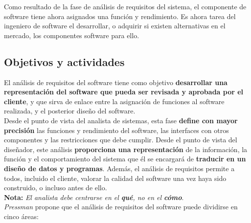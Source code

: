 Como resultado de la fase de análisis de requisitos del sistema, el componente de software tiene ahora asignados una función y rendimiento. Es ahora tarea del ingeniero de software el desarrollar, o adquirir si existen alternativas en el mercado, los componentes software para ello.

\subsection{Objetivos y actividades}

El análisis de requisitos del software tiene como objetivo \textbf{desarrollar una representación del software que pueda ser revisada y aprobada por el cliente}, y que sirva de enlace entre la asignación de funciones al software realizada, y el posterior diseño del software.\\

Desde el punto de vista del analista de sistemas, esta fase \textbf{define con mayor precisión} las funciones y rendimiento del software, las interfaces con otros componentes y las restricciones que debe cumplir. Desde el punto de vista del diseñador, este análisis \textbf{proporciona una representación} de la información, la función y el comportamiento del sistema que él se encargará de \textbf{traducir en un diseño de datos y programas}. Además, el análisis de requisitos permite a todos, incluido el cliente, valorar la calidad del software una vez haya sido construido, o incluso antes de ello.\\

\textbf{Nota:} \textit{El analista debe centrarse en el \textbf{qué}, no en el \textbf{cómo}}.\\

\textit{Pressman} propone que el análisis de requisitos del software puede dividirse en cinco áreas:

